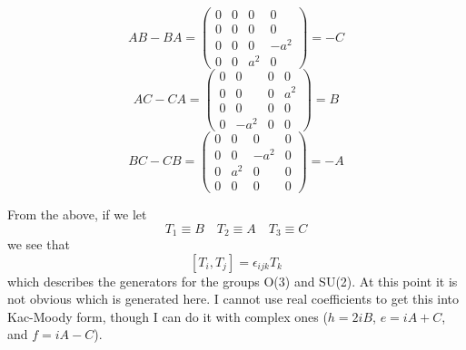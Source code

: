 \documentclass[12pt]{article}
\begin{document}
$$AB-BA = \left( \begin{array}{cccc} 0 & 0 & 0 & 0 \\ 0 & 0 & 0 & 0 \\
0 & 0 & 0 & -a^2 \\ 0 & 0 & a^2 & 0 \end{array} \right) = -C$$
$$AC-CA = \left( \begin{array}{cccc} 0 & 0 & 0 & 0 \\ 0 & 0 & 0 & a^2 \\
0 & 0 & 0 & 0 \\ 0 & -a^2 & 0 & 0 \end{array} \right) = B$$
$$BC-CB = \left( \begin{array}{cccc} 0 & 0 & 0 & 0 \\ 0 & 0 & -a^2 & 0 \\
0 & a^2 & 0 & 0 \\ 0 & 0 & 0 & 0 \end{array} \right) = - A$$

 From the above, if we let
$$T_1 \equiv B \quad 
T_2 \equiv A \quad 
T_3 \equiv C$$
we see that
$$\left[ T_i, T_j \right] = \epsilon_{ijk} T_k$$
which describes the generators for the groups O(3) and SU(2).  At this
point it is not obvious which is generated here.  I cannot use real
coefficients to get this into Kac-Moody form, though I can do it with
complex ones ($h = 2 i B$, $e=iA+C$, and $f=iA-C$).
\end{document}
